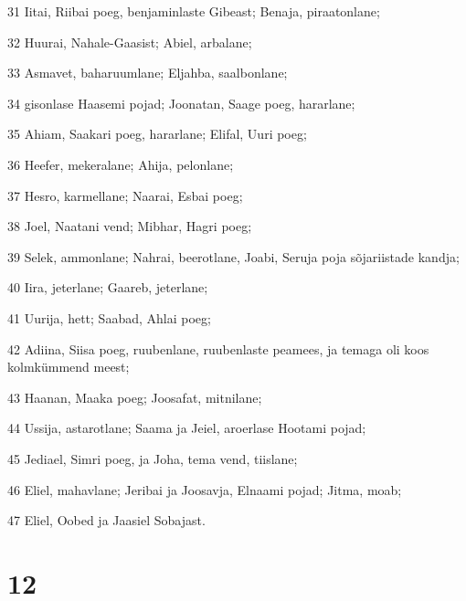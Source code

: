 \par 31 Iitai, Riibai poeg, benjaminlaste Gibeast; Benaja, piraatonlane;
\par 32 Huurai, Nahale-Gaasist; Abiel, arbalane;
\par 33 Asmavet, baharuumlane; Eljahba, saalbonlane;
\par 34 gisonlase Haasemi pojad; Joonatan, Saage poeg, hararlane;
\par 35 Ahiam, Saakari poeg, hararlane; Elifal, Uuri poeg;
\par 36 Heefer, mekeralane; Ahija, pelonlane;
\par 37 Hesro, karmellane; Naarai, Esbai poeg;
\par 38 Joel, Naatani vend; Mibhar, Hagri poeg;
\par 39 Selek, ammonlane; Nahrai, beerotlane, Joabi, Seruja poja sõjariistade kandja;
\par 40 Iira, jeterlane; Gaareb, jeterlane;
\par 41 Uurija, hett; Saabad, Ahlai poeg;
\par 42 Adiina, Siisa poeg, ruubenlane, ruubenlaste peamees, ja temaga oli koos kolmkümmend meest;
\par 43 Haanan, Maaka poeg; Joosafat, mitnilane;
\par 44 Ussija, astarotlane; Saama ja Jeiel, aroerlase Hootami pojad;
\par 45 Jediael, Simri poeg, ja Joha, tema vend, tiislane;
\par 46 Eliel, mahavlane; Jeribai ja Joosavja, Elnaami pojad; Jitma, moab;
\par 47 Eliel, Oobed ja Jaasiel Sobajast.

\chapter{12}

